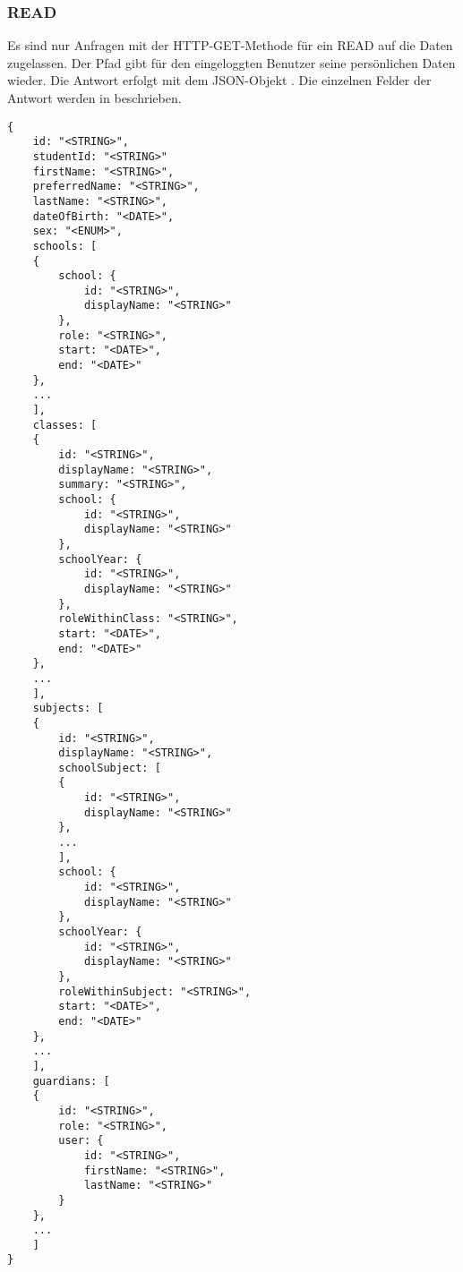 \subsubsection{READ}
\label{sec:rest:api:user:read}
Es sind nur Anfragen mit der HTTP-GET-Methode für ein READ auf die Daten zugelassen.
Der Pfad gibt für den eingeloggten Benutzer seine persönlichen Daten wieder.
Die Antwort erfolgt mit dem JSON-Objekt . 
Die einzelnen Felder der Antwort werden in  beschrieben.

\begin{lstlisting}[caption={JSON-Antwort für einen GET-Aufruf des Pfads /api/users},label={lst:code:rest:api:user:read:ret},frame=tlrb]
{
	id: "<STRING>",
	studentId: "<STRING>"
 	firstName: "<STRING>",
 	preferredName: "<STRING>",
 	lastName: "<STRING>",
 	dateOfBirth: "<DATE>",
 	sex: "<ENUM>",
 	schools: [
 	{
 		school: {
 			id: "<STRING>",
 			displayName: "<STRING>"
 		},
 		role: "<STRING>",
 		start: "<DATE>",
 		end: "<DATE>"
 	},
 	...
 	],
 	classes: [
 	{
 		id: "<STRING>",
 		displayName: "<STRING>",
 		summary: "<STRING>",
 		school: {
 			id: "<STRING>",
 			displayName: "<STRING>"
 		},
 		schoolYear: {
 			id: "<STRING>",
 			displayName: "<STRING>"
 		},
 		roleWithinClass: "<STRING>",
 		start: "<DATE>",
 		end: "<DATE>"
 	},
 	...
	],
	subjects: [
	{
		id: "<STRING>",
		displayName: "<STRING>",
		schoolSubject: [
 		{
 			id: "<STRING>",
 			displayName: "<STRING>"
 		},
 		...
 		],
 		school: {
 			id: "<STRING>",
 			displayName: "<STRING>"
 		},
 		schoolYear: {
 			id: "<STRING>",
 			displayName: "<STRING>"
 		},
 		roleWithinSubject: "<STRING>",
 		start: "<DATE>",
 		end: "<DATE>" 		
	},
	...
	],
	guardians: [
	{
		id: "<STRING>",
		role: "<STRING>",
		user: {
			id: "<STRING>",
			firstName: "<STRING>",
			lastName: "<STRING>"		
		}
	},
	...
	]
}
\end{lstlisting}

